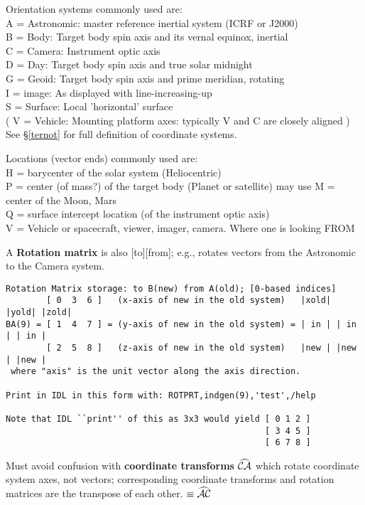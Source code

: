 \documentclass{article}
\begin{document}
Orientation systems commonly used are:
\\ A = Astronomic: master reference inertial system (ICRF or J2000)
\\ B = Body:       Target body spin axis and its vernal equinox, inertial
\\ C = Camera:     Instrument optic axis
\\ D = Day:        Target body spin axis and true solar midnight
\\ G = Geoid:      Target body spin axis and prime meridian, rotating
\\ I = image:      As displayed with line-increasing-up 
\\ S = Surface:    Local 'horizontal' surface
\\ ( V = Vehicle:    Mounting platform axes: typically V and C are closely aligned )
\\ See \S \ref{ternot} for full definition of coordinate systems.

Locations (vector ends) commonly used are:
\\ H = barycenter of the solar system (Heliocentric)
\\ P = center (of mass?) of the target body (Planet or satellite)
\qi may use M = center of the Moon, Mars
\\ Q = surface intercept location (of the instrument optic axis)
\\ V = Vehicle or spacecraft, viewer, imager, camera. Where one is looking FROM

A \textbf{Rotation matrix} is also [to][from];  
 e.g.,  rotates vectors from the Astronomic to the Camera system.


\begin{verbatim}
Rotation Matrix storage: to B(new) from A(old); [0-based indices]
        [ 0  3  6 ]   (x-axis of new in the old system)   |xold| |yold| |zold|
BA(9) = [ 1  4  7 ] = (y-axis of new in the old system) = | in | | in | | in |
        [ 2  5  8 ]   (z-axis of new in the old system)   |new | |new | |new |
 where "axis" is the unit vector along the axis direction.

Print in IDL in this form with: ROTPRT,indgen(9),'test',/help

Note that IDL ``print'' of this as 3x3 would yield [ 0 1 2 ]
                                                   [ 3 4 5 ]
                                                   [ 6 7 8 ]
\end{verbatim}

Must avoid confusion with \textbf{coordinate transforms} $\widehat {\mathcal{CA}}$ which rotate
coordinate system axes, not vectors; corresponding coordinate transforms and
rotation matrices are the transpose of each other.   $\equiv \widehat {\mathcal{AC}}$
\end{document}
